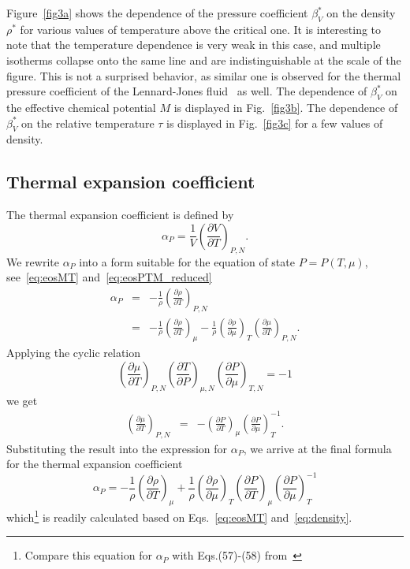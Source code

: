 \documentclass[fleqn,twoside,twocolumn,nofootinbib,showkeys]{revtex4} %
\begin{document}
	Figure~\ref{fig3a} shows the dependence of the pressure coefficient $\beta^*_V$ on the density $\rho^*$ for various values of temperature above the critical one. It is interesting to note that the temperature dependence is very weak in this case, and multiple isotherms collapse onto the same line and are indistinguishable at the scale of the figure. This is not a surprised behavior, as similar one is observed for the thermal pressure coefficient of the Lennard-Jones fluid~\cite{YigzaweSadus2013} as well. The dependence of $\beta^*_V$ on the effective chemical potential $M$ is displayed in Fig.~\ref{fig3b}. The dependence of $\beta^*_V$ on the relative temperature $\tau$ is displayed in Fig.~\ref{fig3c} for a few values of density.
	
	\subsection{Thermal expansion coefficient}
	The thermal expansion coefficient is defined by
	\begin{equation}
		\alpha_P = \frac{1}{V}\left(\frac{\partial V}{\partial T}\right)_{P,N}.
	\end{equation}
	We rewrite $\alpha_P$ into a form suitable for the equation of state $P=P(T,\mu)$, see~\eqref{eq:eosMT} and~\eqref{eq:eosPTM_reduced}
	\begin{eqnarray}
		\label{eq:alpha_vs_rho}
		\alpha_P & = & -\frac{1}{\rho} \left(\frac{\partial \rho}{\partial T}\right)_{P, N}
		\\
		& = & -\frac{1}{\rho} \left(\frac{\partial \rho}{\partial T}\right)_{\mu} 
		- \frac{1}{\rho} \left(\frac{\partial \rho}{\partial \mu}\right)_{T}
		\left(\frac{\partial \mu}{\partial T}\right)_{P, N}.
	\end{eqnarray}
	Applying the cyclic relation
	\begin{equation*}
		\left(\frac{\partial \mu}{\partial T}\right)_{P, N}
		\left(\frac{\partial T}{\partial P}\right)_{\mu, N}
		\left(\frac{\partial P}{\partial \mu}\right)_{T, N}
		= -1
	\end{equation*}
	we get
	\begin{eqnarray*}
		\left(\frac{\partial \mu}{\partial T}\right)_{P, N} & = & 
		- \left(\frac{\partial P}{\partial T}\right)_{\mu}
		\left(\frac{\partial P}{\partial \mu}\right)^{-1}_{T}.
	\end{eqnarray*}
	Substituting the result into the expression for $\alpha_P$, we arrive at the final formula for the thermal expansion coefficient
	\begin{equation}
		\label{eq:alphaP1}
		\alpha_P = -\frac{1}{\rho}\left(\frac{\partial \rho}{\partial T}\right)_{\mu}
		+ \frac{1}{\rho} \left(\frac{\partial \rho}{\partial \mu}\right)_{T}
		\left(\frac{\partial P}{\partial T}\right)_{\mu}
		\left(\frac{\partial P}{\partial \mu}\right)^{-1}_{T}
	\end{equation}
	which\footnote{Compare this equation for $\alpha_P$ with Eqs.(57)-(58) from~\cite{StrokerMeier2021}} is readily calculated based on Eqs.~\eqref{eq:eosMT} and~\eqref{eq:density}.
	
\end{document}
